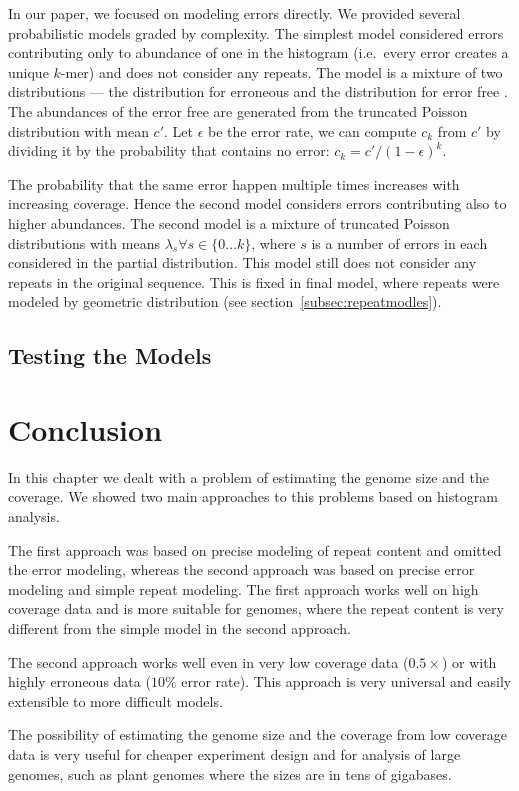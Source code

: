 In our paper\cite{covest}, we focused on modeling errors directly. We provided several probabilistic models graded by complexity.
The simplest model considered errors contributing only to abundance of one in the histogram (i.e.\ every error creates a unique $k$-mer) and does not consider any repeats. The model is a mixture of two distributions --- the distribution for erroneous \kmers and the distribution for error free \kmers. The abundances of the error free \kmers are generated from the truncated Poisson distribution with mean $c'$. Let $\epsilon$ be the error rate, we can compute $c_k$ from $c'$ by dividing it by the probability that \kmer contains no error: $c_k = c'/{(1-\epsilon)}^k$.

The probability that the same error happen multiple times increases with increasing coverage. Hence the second model considers errors contributing also to higher abundances.
The second model is a mixture of truncated Poisson distributions with means $\lambda_s \forall s \in \{0\dots k\}$, where $s$ is a number of errors in each \kmer considered in the partial distribution. This model still does not consider any repeats in the original sequence.
This is fixed in final model, where repeats were modeled by geometric distribution (see section~\ref{subsec:repeatmodles}).


\subsection{Testing the Models}


\section{Conclusion}


In this chapter we dealt with a problem of estimating the genome size and the coverage. We showed two main approaches to this problems based on \kmer histogram analysis.

The first approach was based on precise modeling of repeat content and omitted the error modeling, whereas the second approach was based on precise error modeling and simple repeat modeling.
The first approach works well on high coverage data and is more suitable for genomes, where the repeat content is very different from the simple model in the second approach.

The second approach works well even in very low coverage data ($0.5\times$) or with highly erroneous data ($10\%$ error rate). This approach is very universal and easily extensible to more difficult models.

The possibility of estimating the genome size and the coverage from low coverage data is very useful for cheaper experiment design and for analysis of large genomes, such as plant genomes where the sizes are in tens of gigabases.

